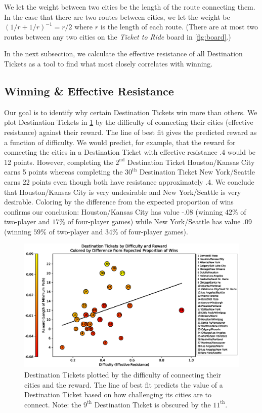 We let the weight between two cities be the length
of the route connecting them.
In the case that there are two routes between cities,
we let the weight be $(1/r + 1/r)^{-1}=r/2$ where
$r$ is the length of each route.
(There are at most two routes between any two cities
on the \textit{Ticket to Ride} board 
in \cref{fig:board}.)

In the next subsection, we calculate the effective
resistance of all Destination Tickets as a tool
to find what most closely correlates with winning.

\subsection{Winning \& Effective Resistance}
\label{sec:winning_and_resistance}

Our goal is to identify why certain Destination
Tickets win more than others.
We plot Destination Tickets in \cref{fig:resistance}
by the difficulty of connecting their cities (effective
resistance) against their reward.
The line of best fit gives the predicted reward
as a function of difficulty.
We would predict, for example, that the reward for 
connecting the cities
in a Destination Ticket with effective resistance .4 would
be 12 points.
However, completing the $2^\text{nd}$ Destination Ticket 
Houston/Kansas City earns 5 points whereas
completing the $30^\text{th}$ Destination Ticket
New York/Seattle earns 22 points even though
both have resistance approximately .4.
We conclude that Houston/Kansas City is very undesirable
and New York/Seattle is very desirable.
Coloring by the difference from the expected proportion
of wins confirms our conclusion:
Houston/Kansas City has value -.08 (winning $42\%$ of
two-player and $17\%$ of four-player games) while
New York/Seattle has value .09 (winning $59\%$ of
two-player and $34\%$ of four-player games).

\begin{figure}[h]
    \centering
    \includegraphics[scale=.6]{figures/resistance_aggregate}
    \caption{Destination Tickets plotted by the
    difficulty of connecting their cities and the reward.
    The line of best fit predicts the value of a Destination
    Ticket based on how challenging its cities
    are to connect.
    Note: the $9^{\text{th}}$ Destination Ticket 
    is obscured by the $11^{\text{th}}$.}
    \label{fig:resistance}
\end{figure}

